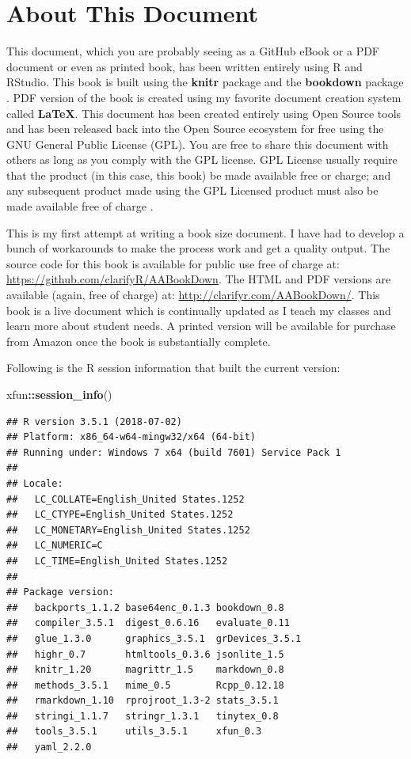 \documentclass[]{krantz}
\makeatletter
\newenvironment{Shaded}{\begin{snugshade}}{\end{snugshade}}
\newcommand{\KeywordTok}[1]{\textcolor[rgb]{0.27,0.27,0.27}{\textbf{#1}}}
\newcommand{\OperatorTok}[1]{\textcolor[rgb]{0.43,0.43,0.43}{\textbf{#1}}}
\newcommand{\NormalTok}[1]{#1}
\newenvironment{kframe}{%
\medskip{}
\setlength{\fboxsep}{.8em}
 \def\at@end@of@kframe{}%
 \ifinner\ifhmode%
  \def\at@end@of@kframe{\end{minipage}}%
  \begin{minipage}{\columnwidth}%
 \fi\fi%
 \def\FrameCommand##1{\hskip\@totalleftmargin \hskip-\fboxsep
 \colorbox{shadecolor}{##1}\hskip-\fboxsep
     \hskip-\linewidth \hskip-\@totalleftmargin \hskip\columnwidth}%
 \MakeFramed {\advance\hsize-\width
   \@totalleftmargin\z@ \linewidth\hsize
   \@setminipage}}%
 {\par\unskip\endMakeFramed%
 \at@end@of@kframe}
\renewenvironment{Shaded}{\begin{kframe}}{\end{kframe}}
\makeatother
\begin{document}
\section*{About This Document}\label{about-this-document}


This document, which you are probably seeing as a GitHub eBook or a PDF
document or even as printed book, has been written entirely using R and
RStudio. This book is built using the \textbf{knitr}
package \citep{xie2015} and the \textbf{bookdown}
package \citep{R-bookdown}. PDF version of the book is created using my
favorite document creation system called \textbf{LaTeX}. This document
has been created entirely using Open Source tools and has been released
back into the Open Source ecosystem for free using the GNU General
Public License (GPL). You are free to share this document with others as
long as you comply with the GPL license. GPL License usually require
that the product (in this case, this book) be made available free or
charge; and any subsequent product made using the GPL Licensed product
must also be made available free of charge \citep{TheGNUGe51:online}.

This is my first attempt at writing a book size document. I have had to
develop a bunch of workarounds to make the process work and get a
quality output. The source code for this book is available for public
use free of charge at: \url{https://github.com/clarifyR/AABookDown}. The
HTML and PDF versions are available (again, free of charge) at:
\url{http://clarifyr.com/AABookDown/}. This book is a live document
which is continually updated as I teach my classes and learn more about
student needs. A printed version will be available for purchase from
Amazon once the book is substantially complete.

Following is the R session information that built the current version:

\begin{Shaded}
\begin{Highlighting}[]
\NormalTok{xfun}\OperatorTok{::}\KeywordTok{session_info}\NormalTok{()}
\end{Highlighting}
\end{Shaded}

\begin{verbatim}
## R version 3.5.1 (2018-07-02)
## Platform: x86_64-w64-mingw32/x64 (64-bit)
## Running under: Windows 7 x64 (build 7601) Service Pack 1
## 
## Locale:
##   LC_COLLATE=English_United States.1252 
##   LC_CTYPE=English_United States.1252   
##   LC_MONETARY=English_United States.1252
##   LC_NUMERIC=C                          
##   LC_TIME=English_United States.1252    
## 
## Package version:
##   backports_1.1.2 base64enc_0.1.3 bookdown_0.8   
##   compiler_3.5.1  digest_0.6.16   evaluate_0.11  
##   glue_1.3.0      graphics_3.5.1  grDevices_3.5.1
##   highr_0.7       htmltools_0.3.6 jsonlite_1.5   
##   knitr_1.20      magrittr_1.5    markdown_0.8   
##   methods_3.5.1   mime_0.5        Rcpp_0.12.18   
##   rmarkdown_1.10  rprojroot_1.3-2 stats_3.5.1    
##   stringi_1.1.7   stringr_1.3.1   tinytex_0.8    
##   tools_3.5.1     utils_3.5.1     xfun_0.3       
##   yaml_2.2.0
\end{verbatim}
\end{document}
